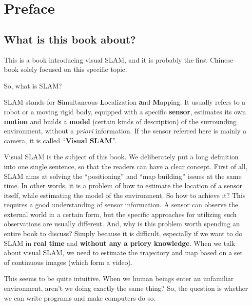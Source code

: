 \chapter{Preface}

\section{What is this book about?}

This is a book introducing visual SLAM, and it is probably the first Chinese book solely focused on this specific topic.

So, what is SLAM?

SLAM stands for \textbf{S}imultaneous \textbf{L}ocalization \textbf{a}nd \textbf{M}apping. It usually refers to a robot or a moving rigid body, equipped with a specific \textbf{sensor}, estimates its own \textbf{motion} and builds a \textbf{model} (certain kinds of description) of the surrounding environment, without a \textit{priori} information\cite{Davison2007}. If the sensor referred here is mainly a camera, it is called ``\textbf{Visual SLAM}''.

Visual SLAM is the subject of this book. We deliberately put a long definition into one single sentence, so that the readers can have a clear concept. First of all, SLAM aims at solving the ``positioning'' and ``map building'' issues at the same time. In other words, it is a problem of how to estimate the location of a sensor itself, while estimating the model of the environment. So how to achieve it? This requires a good understanding of sensor information. A sensor can observe the external world in a certain form, but the specific approaches for utilizing such observations are usually different. And, why is this problem worth spending an entire book to discuss? Simply because it is difficult, especially if we want to do SLAM in \textbf{real time} and \textbf{without any a priory knowledge}. When we talk about visual SLAM, we need to estimate the trajectory and map based on a set of continuous images (which form a video).

This seems to be quite intuitive. When we human beings enter an unfamiliar environment, aren't we doing exactly the same thing? So, the question is whether we can write programs and make computers do so. 

